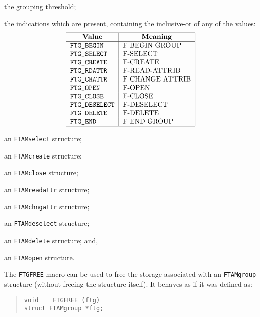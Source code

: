 \begin{describe}
\item[\verb"ftg\_threshold":] the grouping threshold;

\item[\verb"ftg\_flags":] the indications which are present,
containing the inclusive-or of any of the values:
\[\begin{tabular}{|l|l|}
\hline
    \multicolumn{1}{|c|}{\bf Value}&
		\multicolumn{1}{c|}{\bf Meaning}\\
\hline
    \tt FTG\_BEGIN&	F-BEGIN-GROUP\\
    \tt FTG\_SELECT&	F-SELECT\\
    \tt FTG\_CREATE&	F-CREATE\\
    \tt FTG\_RDATTR&	F-READ-ATTRIB\\
    \tt FTG\_CHATTR&	F-CHANGE-ATTRIB\\
    \tt FTG\_OPEN&	F-OPEN\\
    \tt FTG\_CLOSE&	F-CLOSE\\
    \tt FTG\_DESELECT&	F-DESELECT\\
    \tt FTG\_DELETE&	F-DELETE\\
    \tt FTG\_END&	F-END-GROUP\\
\hline
\end{tabular}\]

\item[\verb"ftg\_select":]	an \verb"FTAMselect" structure;

\item[\verb"ftg\_create":]	an \verb"FTAMcreate" structure;

\item[\verb"ftg\_close":]	an \verb"FTAMclose" structure;

\item[\verb"ftg\_readattr":]	an \verb"FTAMreadattr" structure;

\item[\verb"ftg\_chngattr":]	an \verb"FTAMchngattr" structure;

\item[\verb"ftg\_deselect":]	an \verb"FTAMdeselect" structure;

\item[\verb"ftg\_delete":]	an \verb"FTAMdelete" structure;
and,

\item[\verb"ftg\_open":]	an \verb"FTAMopen" structure.
\end{describe}
The \verb"FTGFREE" macro can be used to free the storage associated with an
\verb"FTAMgroup" structure (without freeing the structure itself).
It behaves as if it was defined as:
\begin{quote}\small\begin{verbatim}
void    FTGFREE (ftg)
struct FTAMgroup *ftg;
\end{verbatim}\end{quote}


